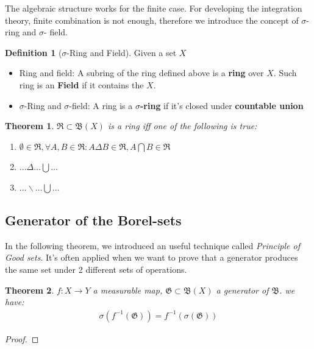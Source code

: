 \documentclass[a4paper,11pt,oneside,fleqn]{book}
\newtheorem{theorem}{Theorem}[section]
\theoremstyle{definition}
\newtheorem{definition}{Definition}[section]
\theoremstyle{remark}
\begin{document}
The algebraic structure works for the finite case. For developing the integration theory, finite combination is not enough, therefore we introduce the concept of $\sigma$- ring and $\sigma$- field.

\begin{definition}[$\sigma$-Ring and Field]
Given a set $X$
	\begin{itemize}
		\item Ring and field: A subring of the ring defined above is a \textbf{ring }over $X$. Such ring is an \textbf{Field} if it contains the $X$.  
		\item $\sigma$-Ring  and $\sigma$-field: A ring is a \textbf{$\sigma$-ring} if it's closed under \textbf{countable union}
	\end{itemize}
\end{definition}

\begin{theorem}
	$\mathfrak{R} \subset \mathfrak B(X)$ is a ring iff one of the following is true:
	\begin{enumerate}
		\item $\emptyset \in \mathfrak{R}, \forall A, B \in \mathfrak{R}: A \Delta B \in \mathfrak{R}, A\bigcap B \in \mathfrak{R}$
		\item $\dots\Delta\dots \bigcup \dots$
		\item $\dots\backslash\dots \bigcup \dots$
	\end{enumerate}
\end{theorem}


\subsection{Generator of the Borel-sets}
In the following theorem, we introduced an useful technique called \textit{Principle of Good sets}. It's often applied when we want to prove that a generator produces the same set under 2 different sets of operations.
\begin{theorem}
	$f: X \rightarrow Y$ a measurable map, $\mathfrak{G} \subset \mathfrak{B}(X)$ a generator of $\mathfrak{B}$. we have:
	\begin{align*}
		\sigma(f^{-1}(\mathfrak{G}) ) = f^{-1}(\sigma (\mathfrak{G}))
	\end{align*}
\end{theorem} 
\begin{proof}
\end{proof}
\end{document}
